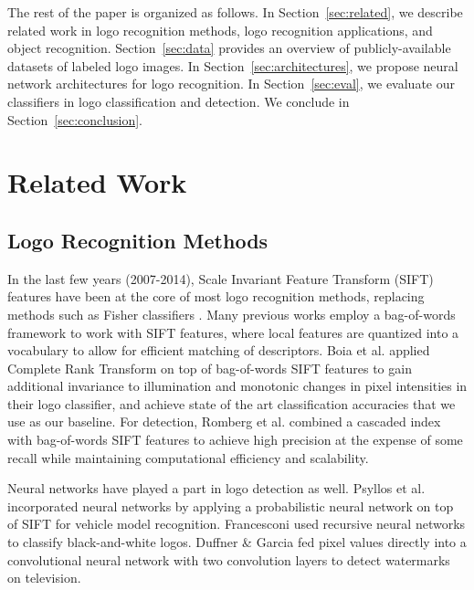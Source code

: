 \documentclass{bmvc2k}
\begin{document}
The rest of the paper is organized as follows.
In Section~\ref{sec:related}, we describe related work in logo recognition methods, logo recognition applications, and object recognition.
Section~\ref{sec:data} provides an overview of publicly-available datasets of labeled logo images.
In Section~\ref{sec:architectures}, we propose neural network architectures for logo recognition.
In Section~\ref{sec:eval}, we evaluate our classifiers in logo classification and detection.
We conclude in Section~\ref{sec:conclusion}.

\section{Related Work}
\vspace{-0.1in}
\label{sec:related}

\subsection{Logo Recognition Methods}

\vspace{-0.1in}

In the last few years (2007-2014), Scale Invariant Feature Transform (SIFT) features have been at the core of most logo recognition methods, replacing methods such as Fisher classifiers \cite{Guangyu2007}.
Many previous works employ a bag-of-words framework to work with SIFT features,
where local features are quantized into a vocabulary to allow for efficient matching of descriptors.
Boia et al. \cite{Boia2014} applied Complete Rank Transform on top of bag-of-words SIFT features to gain additional invariance to illumination and monotonic changes in pixel intensities in their logo classifier, and achieve state of the art classification accuracies that we use as our baseline. 
For detection, Romberg et al. \cite{Romberg2011} combined a cascaded index with bag-of-words SIFT features to achieve high precision at the expense of some recall while maintaining computational efficiency and scalability. 

Neural networks have played a part in logo detection as well.
Psyllos et al. \cite{Psyllos2011} incorporated neural networks by applying a probabilistic neural network on top of SIFT for vehicle model recognition. 
Francesconi\cite{Francesconi1998} used recursive neural networks to classify black-and-white logos. 
Duffner \& Garcia \cite{duffner2006} fed pixel values directly into a  convolutional neural network with two convolution layers to detect watermarks on television. 
\end{document}
